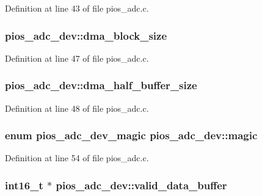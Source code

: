 Definition at line 43 of file pios\-\_\-adc.\-c.

\hypertarget{structpios__adc__dev_a9aa8302b4fd916ed43650b0a9b34e60f}{
\subsubsection[{dma\-\_\-block\-\_\-size}]{ pios\-\_\-adc\-\_\-dev\-::dma\-\_\-block\-\_\-size}}\label{structpios__adc__dev_a9aa8302b4fd916ed43650b0a9b34e60f}


Definition at line 47 of file pios\-\_\-adc.\-c.

\hypertarget{structpios__adc__dev_a4d5c1bf360d769f87ecfe94735683331}{
\subsubsection[{dma\-\_\-half\-\_\-buffer\-\_\-size}]{ pios\-\_\-adc\-\_\-dev\-::dma\-\_\-half\-\_\-buffer\-\_\-size}}\label{structpios__adc__dev_a4d5c1bf360d769f87ecfe94735683331}


Definition at line 48 of file pios\-\_\-adc.\-c.

\hypertarget{structpios__adc__dev_ab066aa96f4656e2fbac6a1a9edc593fc}{
\subsubsection[{magic}]{\setlength{\rightskip}{0pt plus 5cm}enum {\bf pios\-\_\-adc\-\_\-dev\-\_\-magic} pios\-\_\-adc\-\_\-dev\-::magic}}\label{structpios__adc__dev_ab066aa96f4656e2fbac6a1a9edc593fc}


Definition at line 54 of file pios\-\_\-adc.\-c.

\hypertarget{structpios__adc__dev_aef736ba3803c6e41a675eb8b447df5e7}{
\subsubsection[{valid\-\_\-data\-\_\-buffer}]{ {\bf int16\-\_\-t} $\ast$ pios\-\_\-adc\-\_\-dev\-::valid\-\_\-data\-\_\-buffer}}\label{structpios__adc__dev_aef736ba3803c6e41a675eb8b447df5e7}


